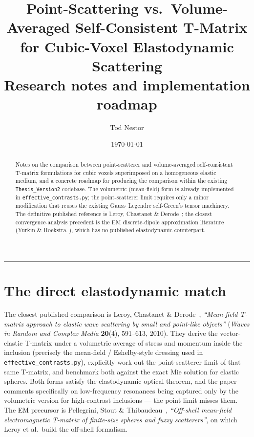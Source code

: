 \documentclass[11pt,a4paper]{article}
\title{Point-Scattering vs.\ Volume-Averaged Self-Consistent T-Matrix \\
       for Cubic-Voxel Elastodynamic Scattering \\
       \large Research notes and implementation roadmap}
\author{Tod Nestor}
\date{\today}
\begin{document}
\maketitle

\begin{abstract}
\noindent
Notes on the comparison between point-scatterer and volume-averaged
self-consistent T-matrix formulations for cubic voxels superimposed
on a homogeneous elastic medium, and a concrete roadmap for producing
the comparison within the existing \texttt{Thesis\_Version2} codebase.
The volumetric (mean-field) form is already implemented in
\texttt{effective\_contrasts.py}; the point-scatterer limit requires
only a minor modification that reuses the existing Gauss--Legendre
self-Green's tensor machinery. The definitive published reference is
Leroy, Chastanet \& Derode~\cite{LeroyChastanetDerode2010}; the
closest convergence-analysis precedent is the EM discrete-dipole
approximation literature (Yurkin \& Hoekstra~\cite{YurkinHoekstra2006a,
YurkinHoekstra2006b}), which has no published elastodynamic
counterpart.
\end{abstract}

\tableofcontents
\vspace{1em}
\hrule
\vspace{1em}

\section{The direct elastodynamic match}

The closest published comparison is Leroy, Chastanet \&
Derode~\cite{LeroyChastanetDerode2010}, \emph{``Mean-field T-matrix
approach to elastic wave scattering by small and point-like objects''}
(\emph{Waves in Random and Complex Media} \textbf{20}(4), 591--613,
2010). They derive the vector-elastic T-matrix under a volumetric
average of stress and momentum inside the inclusion (precisely the
mean-field / Eshelby-style dressing used in \texttt{effective\_contrasts.py}),
explicitly work out the point-scatterer limit of that same T-matrix,
and benchmark both against the exact Mie solution for elastic spheres.
Both forms satisfy the elastodynamic optical theorem, and the paper
comments specifically on low-frequency resonances being captured only
by the volumetric version for high-contrast inclusions --- the point
limit misses them. The EM precursor is
Pellegrini, Stout \& Thibaudeau~\cite{PellegriniStoutThibaudeau1997},
\emph{``Off-shell mean-field electromagnetic T-matrix of finite-size
spheres and fuzzy scatterers''}, on which Leroy et al.\ build the
off-shell formalism.
\end{document}
